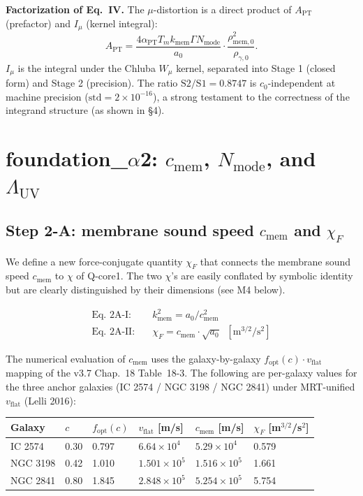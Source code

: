 \documentclass[11pt,a4paper]{article}
\newcommand{\kmem}{k_{\mathrm{mem}}}
\newcommand{\cmem}{c_{\mathrm{mem}}}
\newcommand{\Tm}{T_{m}}
\newcommand{\Nmode}{N_{\mathrm{mode}}}
\newcommand{\aPT}{\alpha_{\mathrm{PT}}}
\newcommand{\rhomem}{\rho_{\mathrm{mem},0}}
\newcommand{\rhog}{\rho_{\gamma,0}}
\newcommand{\Imu}{I_{\mu}}
\newcommand{\Wmu}{W_{\mu}}
\newcommand{\APT}{A_{\mathrm{PT}}}
\newcommand{\Lambdauv}{\Lambda_{\mathrm{UV}}}
\newcommand{\vflat}{v_{\mathrm{flat}}}
\newcommand{\fopt}{f_{\mathrm{opt}}}
\begin{document}
\medskip\noindent
\textbf{Factorization of Eq.~IV.}
The $\mu$-distortion is a direct product of $\APT$ (prefactor) and $\Imu$ (kernel integral):
\[
\APT = \frac{4\aPT \Tm \kmem \Gamma \Nmode}{a_0} \cdot \frac{\rhomem^2}{\rhog}.
\]
$\Imu$ is the integral under the Chluba $\Wmu$ kernel, separated into Stage 1 (closed form) and
Stage 2 (precision). The ratio $\mathrm{S2/S1} = 0.8747$ is $c_0$-independent at machine precision
($\mathrm{std} = 2 \times 10^{-16}$), a strong testament to the correctness of the integrand
structure (as shown in \S 4).

\section{foundation\_$\alpha$2: $\cmem$, $\Nmode$, and $\Lambdauv$}

\subsection{Step 2-A: membrane sound speed $\cmem$ and $\chi_F$}
We define a new force-conjugate quantity $\chi_F$ that connects the membrane sound speed $\cmem$
to $\chi$ of Q-core1. The two $\chi$'s are easily conflated by symbolic identity but are clearly
distinguished by their dimensions (see M4 below).

\begin{keybox}
\begin{align*}
\text{Eq.~2A-I:}\quad &\kmem^2 = a_0 / \cmem^2 \\
\text{Eq.~2A-II:}\quad &\chi_F = \cmem \cdot \sqrt{a_0}\;\; [\mathrm{m}^{3/2}/\mathrm{s}^2]
\end{align*}
\end{keybox}

The numerical evaluation of $\cmem$ uses the galaxy-by-galaxy $\fopt(c) \cdot \vflat$ mapping of
the v3.7 Chap.~18 Table~18-3. The following are per-galaxy values for the three anchor galaxies
(IC 2574 / NGC 3198 / NGC 2841) under MRT-unified $\vflat$ (Lelli 2016):

\begin{center}\small
\begin{tabular}{@{}llllll@{}}
\toprule
Galaxy & $c$ & $\fopt(c)$ & $\vflat$ [m/s] & $\cmem$ [m/s] & $\chi_F$ [m$^{3/2}$/s$^2$] \\
\midrule
IC 2574  & 0.30 & 0.797 & $6.64 \times 10^{4}$ & $5.29 \times 10^{4}$ & 0.579 \\
NGC 3198 & 0.42 & 1.010 & $1.501 \times 10^{5}$ & $1.516 \times 10^{5}$ & 1.661 \\
NGC 2841 & 0.80 & 1.845 & $2.848 \times 10^{5}$ & $5.254 \times 10^{5}$ & 5.754 \\
\bottomrule
\end{tabular}
\end{center}
\end{document}
